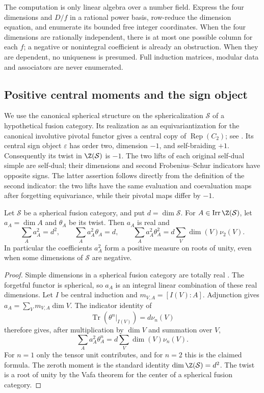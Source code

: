 The computation is only linear algebra over a number field. Express the
four dimensions and $D/f$ in a rational power basis, row-reduce the dimension
equation, and enumerate its bounded free integer coordinates. When the
four dimensions are rationally independent, there is at most one possible
column for each $f$; a negative or nonintegral coefficient is already an
obstruction. When they are dependent, no uniqueness is presumed. Full
induction matrices, modular data and associators are never enumerated.




\subsection{Positive central moments and the sign object}
\label{finite:sec:frontier-signed-gauss}

We use the canonical spherical structure on the sphericalization
$\mathcal S$ of a hypothetical fusion category. Its realization as an
equivariantization for the canonical involutive pivotal functor gives
a central copy of $\operatorname{Rep}(C_2)$; see \cite[Section~5.3]{Bartlett}. Its central sign object
$\varepsilon$ has order two, dimension $-1$, and self-braiding $+1$.
Consequently its twist in $\Z(\mathcal S)$ is $-1$.
The two lifts of each original self-dual simple are self-dual; their
dimensions and second Frobenius--Schur indicators have opposite signs.
The latter assertion follows directly from the definition of the second
indicator: the two lifts have the same evaluation and coevaluation maps
after forgetting equivariance, while their pivotal maps differ by $-1$.

\begin{lemma}
\label{finite:lem:positive-central-squares}
Let $\mathcal S$ be a spherical fusion category, and put
$d=\dim\mathcal S$. For $A\in\operatorname{Irr}\Z(\mathcal S)$,
let $a_A=\dim A$ and $\theta_A$ be its twist. Then $a_A$ is real and
\[
 \sum_A a_A^2=d^2,\qquad
 \sum_A a_A^2\theta_A=d,\qquad
 \sum_A a_A^2\theta_A^2=d\sum_V\dim(V)\nu_2(V).
\]
In particular the coefficients $a_A^2$ form a positive measure on roots
of unity, even when some dimensions of $\mathcal S$ are negative.
\end{lemma}
\begin{proof}
Simple dimensions in a spherical fusion category are totally real
\cite[Section~2.1]{Ostrik3}. The forgetful functor is spherical, so
$a_A$ is an integral linear combination of these real dimensions. Let $I$ be
central induction and $m_{V,A}=[I(V):A]$. Adjunction gives
$a_A=\sum_Vm_{V,A}\dim V$.
The indicator identity of \cite[Theorem~4.1]{NS}
\[
 \operatorname{Tr}(\theta^n\vert_{I(V)})=d\nu_n(V)
\]
therefore gives, after multiplication by $\dim V$ and summation over $V$,
\[\sum_A a_A^2\theta_A^n=d\sum_V\dim(V)\nu_n(V).\]
For $n=1$ only the tensor unit contributes, and for $n=2$ this is the
claimed formula. The zeroth moment is the standard identity
$\dim\Z(\mathcal S)=d^2$. The twist is a root of unity by the
Vafa theorem for the center of a spherical fusion category.
\end{proof}

